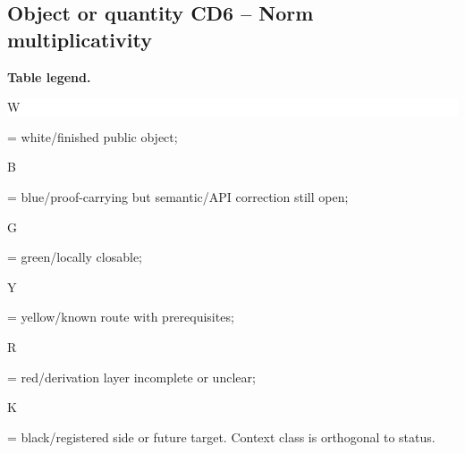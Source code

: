 \subsection*{Object or quantity CD6 -- Norm multiplicativity}
\hypertarget{objproof:CD6}{}
\par\smallskip\noindent\begin{minipage}{0.99\linewidth}\footnotesize\raggedright\textbf{Table legend.} \colorbox{white}{\strut W} = white/finished public object; \colorbox{cyan!20}{\strut B} = blue/proof-carrying but semantic/API correction still open; \colorbox{green!18}{\strut G} = green/locally closable; \colorbox{yellow!25}{\strut Y} = yellow/known route with prerequisites; \colorbox{red!20}{\strut R} = red/derivation layer incomplete or unclear; \colorbox{black!18}{\strut K} = black/registered side or future target. Context class is orthogonal to status.\end{minipage}\par\vspace{0.25em}
